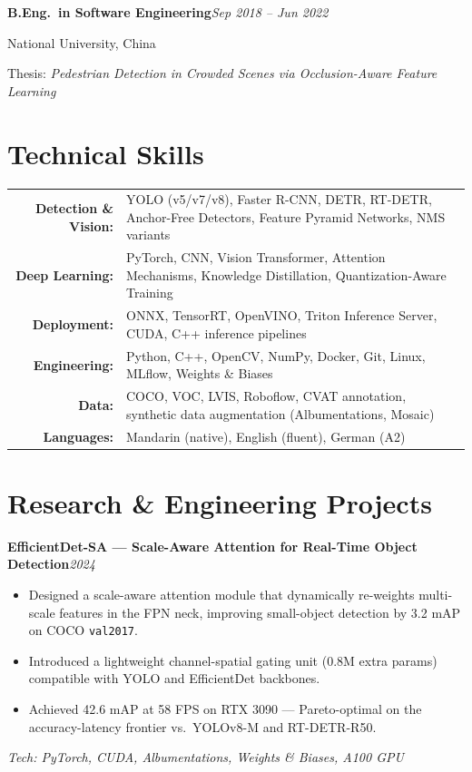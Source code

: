 \documentclass[11pt,a4paper]{article}
\newcommand{\cventry}[3]{%
    \textbf{#1}\hfill\textit{#2}\par\vspace{2pt}%
    #3\par\vspace{7pt}%
}
\newcommand{\cvproject}[4]{%
    \textbf{#1}\hfill\textit{#2}\par\vspace{2pt}%
    #3\par\vspace{1pt}%
    {\small\color{subtext}\textit{Tech: #4}}\par\vspace{7pt}%
}
\newcommand{\skillrow}[2]{%
    \textbf{#1:} & #2 \\[3pt]
}
\begin{document}
\cventry{B.Eng.\ in Software Engineering}{Sep 2018 -- Jun 2022}{%
    National University, China\par\vspace{1pt}
    Thesis: \textit{Pedestrian Detection in Crowded Scenes via Occlusion-Aware Feature Learning}
}

\section{Technical Skills}

\begin{tabularx}{\textwidth}{@{}r X@{}}
    \skillrow{Detection \& Vision}{YOLO (v5/v7/v8), Faster R-CNN, DETR, RT-DETR, Anchor-Free Detectors, Feature Pyramid Networks, NMS variants}
    \skillrow{Deep Learning}{PyTorch, CNN, Vision Transformer, Attention Mechanisms, Knowledge Distillation, Quantization-Aware Training}
    \skillrow{Deployment}{ONNX, TensorRT, OpenVINO, Triton Inference Server, CUDA, C++ inference pipelines}
    \skillrow{Engineering}{Python, C++, OpenCV, NumPy, Docker, Git, Linux, MLflow, Weights \& Biases}
    \skillrow{Data}{COCO, VOC, LVIS, Roboflow, CVAT annotation, synthetic data augmentation (Albumentations, Mosaic)}
    \skillrow{Languages}{Mandarin (native), English (fluent), German (A2)}
\end{tabularx}

\section{Research \& Engineering Projects}

\cvproject{EfficientDet-SA --- Scale-Aware Attention for Real-Time Object Detection}{2024}{%
    \begin{itemize}[leftmargin=14pt, nosep, topsep=2pt, itemsep=1pt]
        \item Designed a scale-aware attention module that dynamically re-weights multi-scale features in the FPN neck, improving small-object detection by 3.2 mAP on COCO \texttt{val2017}.
        \item Introduced a lightweight channel-spatial gating unit (0.8M extra params) compatible with YOLO and EfficientDet backbones.
        \item Achieved 42.6 mAP at 58 FPS on RTX 3090 --- Pareto-optimal on the accuracy-latency frontier vs.\ YOLOv8-M and RT-DETR-R50.
    \end{itemize}
}{PyTorch, CUDA, Albumentations, Weights \& Biases, A100 GPU}
\end{document}
